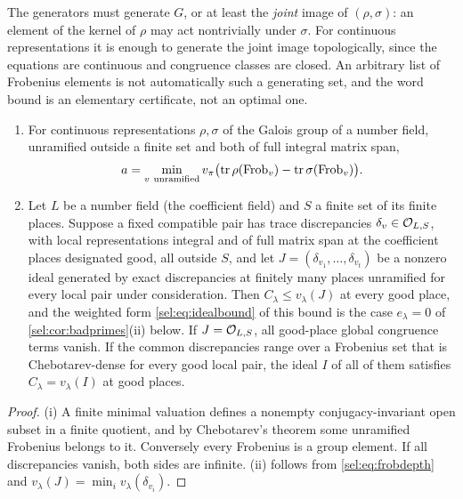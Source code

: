 The generators must generate $G$, or at least the \emph{joint} image of
$(\rho,\sigma)$: an element of the kernel of $\rho$ may act nontrivially
under $\sigma$. For continuous representations it is enough to generate the
joint image topologically, since the equations are continuous and
congruence classes are closed. An arbitrary list of Frobenius elements is
not automatically such a generating set, and the word bound is an
elementary certificate, not an optimal one.

\begin{corollary}\label{sel:cor:frobenius}
\leavevmode
\begin{enumerate}[label=\textup{(\roman*)}]
\item For continuous representations $\rho,\sigma$ of the Galois group of a
number field, unramified outside a finite set and both of full integral
matrix span,
\begin{equation}\label{sel:eq:frobdepth}
 a=\min_{v\ \mathrm{unramified}}
 v_\pi\bigl(\operatorname{tr}\rho(\operatorname{Frob}_v)-\operatorname{tr}\sigma(\operatorname{Frob}_v)\bigr).
\end{equation}
\item Let $L$ be a number field (the coefficient field) and $S$ a finite set
of its finite places.
Suppose a fixed compatible pair has trace discrepancies
$\delta_v\in\mathcal{O}_{L,S}$, with local representations integral and of full
matrix span at the coefficient places designated good, all outside $S$, and
let $J=(\delta_{v_1},\dots,\delta_{v_t})$ be a nonzero ideal generated by
exact discrepancies at finitely many places unramified for every local pair
under consideration. Then $C_\lambda\le v_\lambda(J)$ at every good place,
and the weighted form \eqref{sel:eq:idealbound} of this bound is the case
$e_\lambda=0$ of \cref{sel:cor:badprimes}\textup{(ii)} below.
If $J=\mathcal{O}_{L,S}$, all good-place global congruence terms vanish. If the
common discrepancies range over a Frobenius set that is Chebotarev-dense for
every good local pair, the ideal $I$ of all of them satisfies
$C_\lambda=v_\lambda(I)$ at good places.
\end{enumerate}
\end{corollary}

\begin{proof}
(i) A finite minimal valuation defines a nonempty conjugacy-invariant open
subset in a finite quotient, and by Chebotarev's theorem some unramified
Frobenius belongs to it. Conversely every Frobenius is a group element. If
all discrepancies vanish, both sides are infinite. (ii) follows from
\eqref{sel:eq:frobdepth} and $v_\lambda(J)=\min_iv_\lambda(\delta_{v_i})$.
\end{proof}

